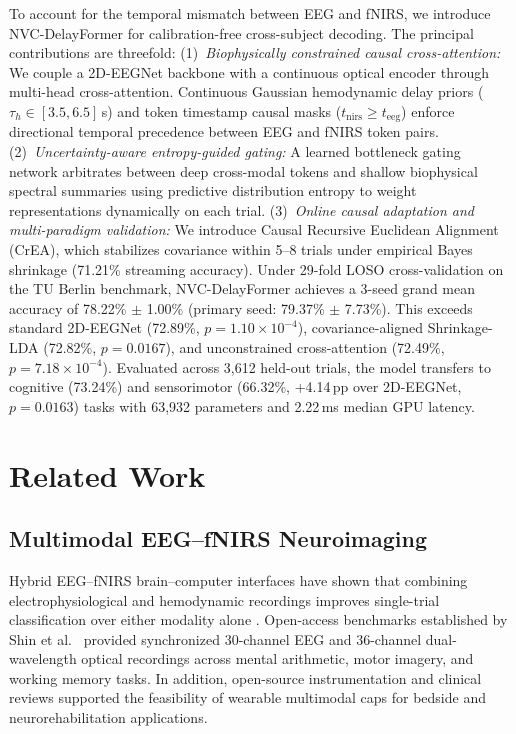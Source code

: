 \documentclass[journal]{IEEEtran}
\begin{document}
To account for the temporal mismatch between EEG and fNIRS, we introduce NVC-DelayFormer for calibration-free cross-subject decoding. The principal contributions are threefold:
(1)~\textit{Biophysically constrained causal cross-attention:} We couple a 2D-EEGNet backbone with a continuous optical encoder through multi-head cross-attention. Continuous Gaussian hemodynamic delay priors ($\tau_h \in [3.5, 6.5]$\,s) and token timestamp causal masks ($t_{\mathrm{nirs}} \ge t_{\mathrm{eeg}}$) enforce directional temporal precedence between EEG and fNIRS token pairs.
(2)~\textit{Uncertainty-aware entropy-guided gating:} A learned bottleneck gating network arbitrates between deep cross-modal tokens and shallow biophysical spectral summaries using predictive distribution entropy to weight representations dynamically on each trial.
(3)~\textit{Online causal adaptation and multi-paradigm validation:} We introduce Causal Recursive Euclidean Alignment (CrEA), which stabilizes covariance within 5--8 trials under empirical Bayes shrinkage (71.21\% streaming accuracy). Under 29-fold LOSO cross-validation on the TU Berlin benchmark, NVC-DelayFormer achieves a 3-seed grand mean accuracy of 78.22\% $\pm$ 1.00\% (primary seed: 79.37\% $\pm$ 7.73\%). This exceeds standard 2D-EEGNet (72.89\%, $p = 1.10\times 10^{-4}$), covariance-aligned Shrinkage-LDA (72.82\%, $p = 0.0167$), and unconstrained cross-attention (72.49\%, $p = 7.18\times 10^{-4}$). Evaluated across 3,612 held-out trials, the model transfers to cognitive (73.24\%) and sensorimotor (66.32\%, +4.14\,pp over 2D-EEGNet, $p = 0.0163$) tasks with 63,932 parameters and 2.22\,ms median GPU latency.

\section{Related Work}
\label{sec:related}
\subsection{Multimodal EEG--fNIRS Neuroimaging}
Hybrid EEG--fNIRS brain--computer interfaces have shown that combining electrophysiological and hemodynamic recordings improves single-trial classification over either modality alone \cite{fazli2012enhanced, buccino2016hybrid}. Open-access benchmarks established by Shin et al.\ \cite{shin2017open, shin2018simultaneous} provided synchronized 30-channel EEG and 36-channel dual-wavelength optical recordings across mental arithmetic, motor imagery, and working memory tasks. In addition, open-source instrumentation \cite{vonluhmann2020open} and clinical reviews \cite{pinti2020present} supported the feasibility of wearable multimodal caps for bedside and neurorehabilitation applications.
\end{document}
